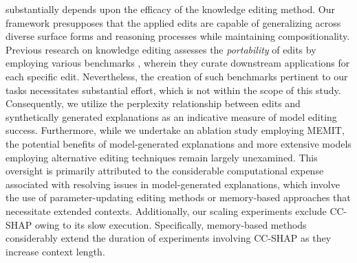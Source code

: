 \methodname substantially depends upon the efficacy of the knowledge editing method. Our framework presupposes that the applied edits are capable of generalizing across diverse surface forms and reasoning processes while maintaining compositionality. Previous research on knowledge editing assesses the \textit{portability} of edits by employing various benchmarks \citep{yao-etal-2023-editing, Zhong2023MQuAKEAK, cohen2024evaluating}, wherein they curate downstream applications for each specific edit. Nevertheless, the creation of such benchmarks pertinent to our tasks necessitates substantial effort, which is not within the scope of this study. Consequently, we utilize the perplexity relationship between edits and synthetically generated explanations as an indicative measure of model editing success. Furthermore, while we undertake an ablation study employing MEMIT, the potential benefits of model-generated explanations and more extensive models employing alternative editing techniques remain largely unexamined. This oversight is primarily attributed to the considerable computational expense associated with resolving issues in model-generated explanations, which involve the use of parameter-updating editing methods or memory-based approaches that necessitate extended contexts. Additionally, our scaling experiments exclude CC-SHAP owing to its slow execution. Specifically, memory-based methods considerably extend the duration of experiments involving CC-SHAP as they increase context length.
